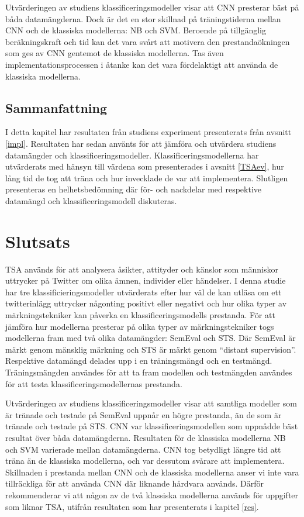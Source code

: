 \documentclass{kaumasters} %
\begin{document}
Utvärderingen av studiens klassificeringsmodeller visar att CNN presterar bäst på båda datamängderna. Dock är det en stor skillnad på träningstiderna mellan CNN och de klassiska modellerna: NB och SVM. Beroende på tillgänglig beräkningskraft och tid kan det vara svårt att motivera den prestandaökningen som ges av CNN gentemot de klassiska modellerna. Tas även implementationsprocessen i åtanke kan det vara fördelaktigt att använda de klassiska modellerna.
\section{Sammanfattning}
I detta kapitel har resultaten från studiens experiment presenterats från avsnitt \ref{impl}. Resultaten har sedan använts för att jämföra och utvärdera studiens datamängder och klassificeringsmodeller. Klassificeringsmodellerna har utvärderats med hänsyn till värdena som presenterades i avsnitt \ref{TSAev}, hur lång tid de tog att träna och hur invecklade de var att implementera. Slutligen presenteras en helhetsbedömning där för- och nackdelar med respektive datamängd och klassificeringsmodell diskuteras.

\chapter{Slutsats}
TSA används för att analysera åsikter, attityder och känslor som människor uttrycker på Twitter om olika ämnen, individer eller händelser. I denna studie har tre klassificieringsmodeller utvärderats efter hur väl de kan utläsa om ett twitterinlägg uttrycker någonting positivt eller negativt och hur olika typer av märkningstekniker kan påverka en klassificeringsmodells prestanda. För att jämföra hur modellerna presterar på olika typer av märkningstekniker togs modellerna fram med två olika datamängder: SemEval och STS. Där SemEval är märkt genom mänsklig märkning och STS är märkt genom “distant supervision”. Respektive datamängd delades upp i en träningsmängd och en testmängd. Träningsmängden användes för att ta fram modellen och testmängden användes för att testa klassificeringsmodellernas prestanda. 

Utvärderingen av studiens klassificeringsmodeller visar att samtliga modeller som är tränade och testade på SemEval uppnår en högre prestanda, än de som är tränade och testade på STS. CNN var klassificeringsmodellen som uppnådde bäst resultat över båda datamängderna. Resultaten för de klassiska modellerna NB och SVM varierade mellan datamängderna. CNN tog betydligt längre tid att träna än de klassiska modellerna, och var dessutom svårare att implementera. Skillnaden i prestanda mellan CNN och de klassiska modellerna anser vi inte vara tillräckliga för att använda CNN där liknande hårdvara används. Därför rekommenderar vi att någon av de två klassiska modellerna används för uppgifter som liknar TSA, utifrån resultaten som har presenterats i kapitel \ref{res}.
\end{document}
